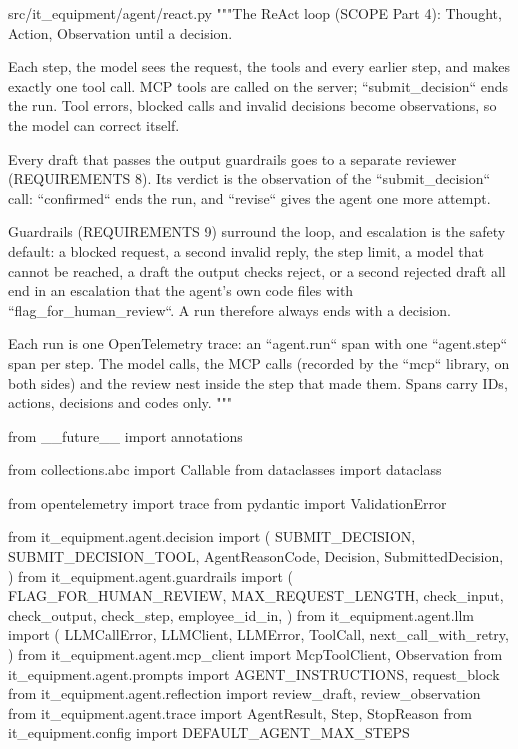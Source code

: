 \documentclass[11pt,letterpaper]{article}
\renewcommand{\_}{\textunderscore\allowbreak}
\begin{document}
\begin{codebox}{src/it_equipment/agent/react.py}
"""The ReAct loop (SCOPE Part 4): Thought, Action, Observation until a decision.

Each step, the model sees the request, the tools and every earlier step, and makes exactly
one tool call. MCP tools are called on the server; ``submit_decision`` ends the run. Tool
errors, blocked calls and invalid decisions become observations, so the model can correct
itself.

Every draft that passes the output guardrails goes to a separate reviewer (REQUIREMENTS 8). Its
verdict is the observation of the ``submit_decision`` call: ``confirmed`` ends the run, and
``revise`` gives the agent one more attempt.

Guardrails (REQUIREMENTS 9) surround the loop, and escalation is the safety default: a
blocked request, a second invalid reply, the step limit, a model that cannot be reached, a
draft the output checks reject, or a second rejected draft all end in an escalation that the
agent's own code files with ``flag_for_human_review``. A run therefore always ends with a
decision.

Each run is one OpenTelemetry trace: an ``agent.run`` span with one ``agent.step`` span per step.
The model calls, the MCP calls (recorded by the ``mcp`` library, on both sides) and the review
nest inside the step that made them. Spans carry IDs, actions, decisions and codes only.
"""

from __future__ import annotations

from collections.abc import Callable
from dataclasses import dataclass

from opentelemetry import trace
from pydantic import ValidationError

from it_equipment.agent.decision import (
    SUBMIT_DECISION,
    SUBMIT_DECISION_TOOL,
    AgentReasonCode,
    Decision,
    SubmittedDecision,
)
from it_equipment.agent.guardrails import (
    FLAG_FOR_HUMAN_REVIEW,
    MAX_REQUEST_LENGTH,
    check_input,
    check_output,
    check_step,
    employee_id_in,
)
from it_equipment.agent.llm import (
    LLMCallError,
    LLMClient,
    LLMError,
    ToolCall,
    next_call_with_retry,
)
from it_equipment.agent.mcp_client import McpToolClient, Observation
from it_equipment.agent.prompts import AGENT_INSTRUCTIONS, request_block
from it_equipment.agent.reflection import review_draft, review_observation
from it_equipment.agent.trace import AgentResult, Step, StopReason
from it_equipment.config import DEFAULT_AGENT_MAX_STEPS


\end{codebox}
\end{document}
